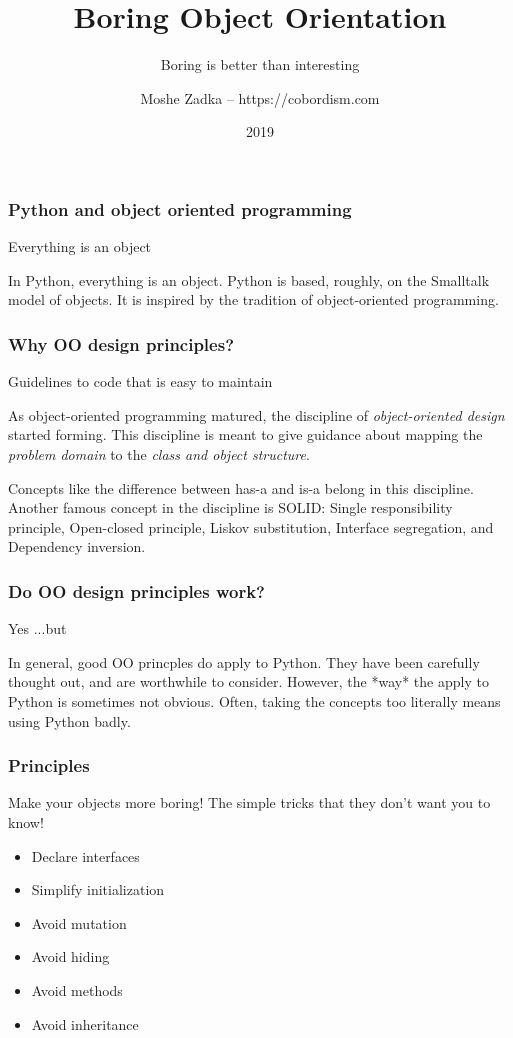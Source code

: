 \documentclass[ignorenonframetext,aspectration=169]{beamer}
\title{Boring Object Orientation}
\subtitle{Boring is better than interesting}
\author{Moshe Zadka -- https://cobordism.com}
\date{2019}
\begin{document}
\begin{titlepage}
\maketitle
\end{titlepage}

\frame{\titlepage}

\begin{frame}[fragile]
\frametitle{Python and object oriented programming}

Everything is an object
\end{frame}

In Python,
everything is an object.
Python is based,
roughly,
on the Smalltalk model of objects.
It is inspired by the tradition of object-oriented programming.

\begin{frame}[fragile]
\frametitle{Why OO design principles?}

Guidelines to code that is easy to maintain
\end{frame}

As object-oriented programming matured,
the discipline of
{\em object-oriented design} started forming.
This discipline is meant to give guidance
about mapping the
{\em problem domain}
to the
{\em class and object structure}.

Concepts like the difference between
has-a
and
is-a
belong in this discipline.
Another famous concept in the discipline
is
SOLID:
Single responsibility principle,
Open-closed principle,
Liskov substitution,
Interface segregation,
and Dependency inversion.

\begin{frame}[fragile]
\frametitle{Do OO design principles work?}

Yes
\pause
...but
\end{frame}

In general,
good OO princples do apply to Python.
They have been carefully thought out,
and are worthwhile to consider.
However,
the
*way*
the apply to Python is sometimes not obvious.
Often,
taking the concepts too literally means
using Python badly.

\begin{frame}[fragile]
\frametitle{Principles}

Make your objects more boring!
The simple tricks that they don't want you to know!

\begin{itemize}
\item Declare interfaces\pause 
\item Simplify initialization\pause
\item Avoid mutation\pause
\item Avoid hiding\pause
\item Avoid methods\pause
\item Avoid inheritance
\end{itemize}

\end{frame}
\end{document}

